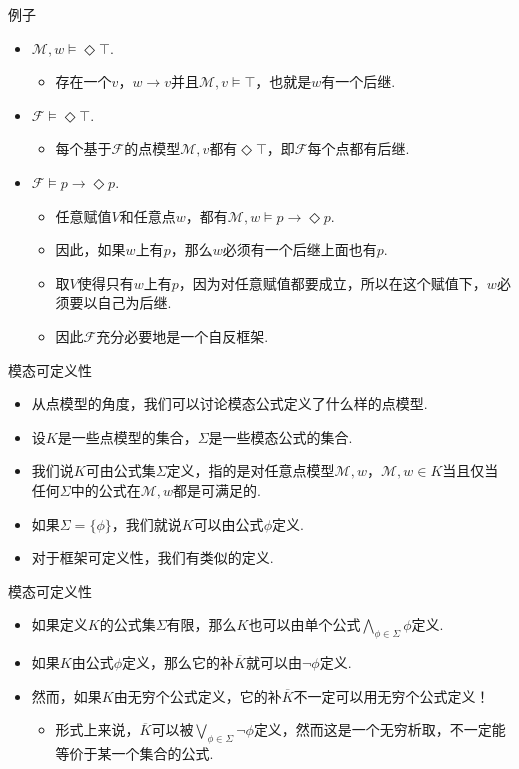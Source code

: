     {例子}
    \begin{itemize}
        \item $\mathcal M,w\vDash\Diamond\top$.
        \begin{itemize}
            \item 存在一个$v$，$w\to v$并且$\mathcal M,v\vDash\top$，也就是$w$有一个后继.
        \end{itemize}
        \item $\mathcal F\vDash\Diamond \top$.
        \begin{itemize}
            \item 每个基于$\mathcal F$的点模型$\mathcal M,v$都有$\Diamond \top$，即$\mathcal F$每个点都有后继.
        \end{itemize}
        \item $\mathcal F\vDash p\to\Diamond p$.
        \begin{itemize}
            \item 任意赋值$V$和任意点$w$，都有$\mathcal M,w\vDash p\to\Diamond p$.
            \item 因此，如果$w$上有$p$，那么$w$必须有一个后继上面也有$p$.
            \item  取$V$使得只有$w$上有$p$，因为对任意赋值都要成立，所以在这个赋值下，$w$必须要以自己为后继.
            \item 因此$\mathcal F$充分必要地是一个自反框架.
        \end{itemize}
    \end{itemize}
    
    
    {模态可定义性}
    \begin{itemize}
        \item 从点模型的角度，我们可以讨论模态公式定义了什么样的点模型.
        \item 设$K$是一些点模型的集合，$\Sigma$是一些模态公式的集合.
        \item 我们说$K$可由公式集$\Sigma$定义，指的是对任意点模型$\mathcal M,w$，$\mathcal M,w\in K$当且仅当任何$\Sigma$中的公式在$\mathcal M,w$都是可满足的.
        \item 如果$\Sigma=\{\phi\}$，我们就说$K$可以由公式$\phi$定义.
        \item 对于框架可定义性，我们有类似的定义.
    \end{itemize}
    
    
    {模态可定义性}
    \begin{itemize}
        \item 如果定义$K$的公式集$\Sigma$有限，那么$K$也可以由单个公式$\bigwedge_{\phi\in\Sigma}\phi$定义.
        \item 如果$K$由公式$\phi$定义，那么它的补$\overline{K}$就可以由$\neg\phi$定义.
        \item 然而，如果$K$由无穷个公式定义，它的补$\overline{K}$不一定可以用无穷个公式定义！
        \begin{itemize}
            \item 形式上来说，$\overline{K}$可以被$\bigvee_{\phi\in\Sigma}\neg\phi$定义，然而这是一个无穷析取，不一定能等价于某一个集合的公式.
        \end{itemize}
    \end{itemize}
    
